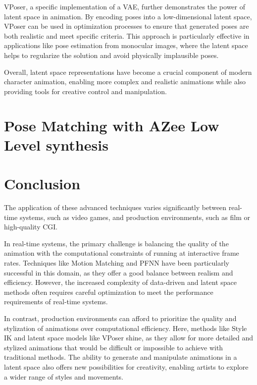 \documentclass[../../main.tex]{subfiles}
\begin{document}
VPoser\cite{TODO}, a specific implementation of a VAE, further demonstrates the power of latent space in animation. By encoding poses into a low-dimensional latent space, VPoser can be used in optimization processes to ensure that generated poses are both realistic and meet specific criteria. This approach is particularly effective in applications like pose estimation from monocular images, where the latent space helps to regularize the solution and avoid physically implausible poses.

Overall, latent space representations have become a crucial component of modern character animation, enabling more complex and realistic animations while also providing tools for creative control and manipulation.

\section{Pose Matching with AZee Low Level synthesis}
\label{ch:pose_matching:pose_matching_with_azee}

\section{Conclusion}
\label{ch:pose_matching:conclusion}

The application of these advanced techniques varies significantly between real-time systems, such as video games, and production environments, such as film or high-quality CGI.

In real-time systems, the primary challenge is balancing the quality of the animation with the computational constraints of running at interactive frame rates. Techniques like Motion Matching and PFNN have been particularly successful in this domain, as they offer a good balance between realism and efficiency. However, the increased complexity of data-driven and latent space methods often requires careful optimization to meet the performance requirements of real-time systems.

In contrast, production environments can afford to prioritize the quality and stylization of animations over computational efficiency. Here, methods like Style IK and latent space models like VPoser shine, as they allow for more detailed and stylized animations that would be difficult or impossible to achieve with traditional methods. The ability to generate and manipulate animations in a latent space also offers new possibilities for creativity, enabling artists to explore a wider range of styles and movements.
\end{document}
